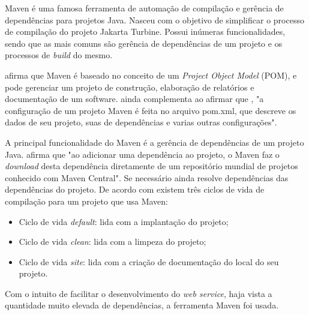 	
	\par Maven é uma famosa ferramenta de automação de compilação e gerência de
dependências para projetos Java. Nasceu com o objetivo de simplificar o processo
de compilação do projeto Jakarta Turbine. Possui inúmeras funcionalidades, sendo
que as mais comuns são gerência de dependências de um projeto e os processos de
\textit{build} do mesmo.
	
	\par {} afirma que Maven é baseado no conceito de um
\textit{Project Object Model} (POM), e pode gerenciar um projeto de
construção, elaboração de relatórios e documentação de um software.
 ainda complementa ao afirmar que , "a configuração de
um projeto Maven é feita no arquivo pom.xml, que descreve os dados de seu
projeto, suas de dependências e varias outras configurações".
	
	\par A principal funcionalidade do Maven é a gerência de dependências de um
projeto Java.  afirma que "ao adicionar uma dependência
ao projeto, o Maven faz o \textit{download} desta dependência diretamente de
um repositório mundial de projetos  conhecido com Maven Central". Se necessário
ainda resolve dependências das dependências do projeto. De acordo com
 existem três ciclos de vida de compilação para um
projeto que usa Maven:

	\begin{itemize}
		  \item Ciclo de vida \textit{default}: lida com a implantação do projeto;
		  \item Ciclo de vida \textit{clean}: lida com a limpeza do projeto;
		  \item Ciclo de vida \textit{site}: lida com a criação de documentação do
		  local do seu projeto. 
	\end{itemize}
	
	\par Com o intuito de facilitar o desenvolvimento do \textit{web service},
haja vista a quantidade muito elevada de dependências, a ferramenta Maven foi
usada.
